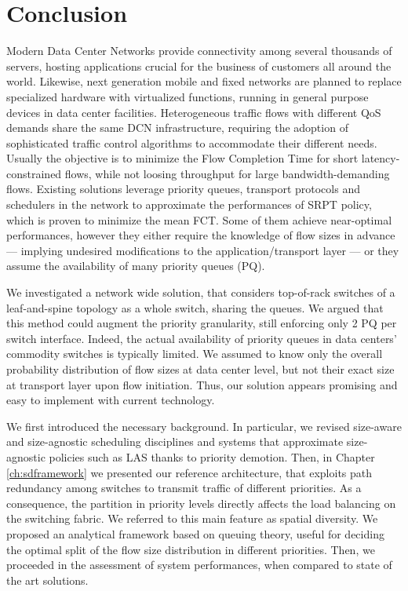 \chapter*{Conclusion}
Modern Data Center Networks provide connectivity among several thousands of servers, hosting applications crucial for the business of customers all around the world. Likewise, next generation mobile and fixed networks are planned to replace specialized hardware with virtualized functions, running in general purpose devices in data center facilities. Heterogeneous traffic flows with different QoS demands share the same DCN infrastructure, requiring the adoption of sophisticated traffic control algorithms to accommodate their different needs. Usually the objective is to minimize the Flow Completion Time for short latency-constrained flows, while not loosing throughput for large bandwidth-demanding flows. Existing solutions leverage priority queues, transport protocols and schedulers in the network to approximate the performances of SRPT policy, which is proven to minimize the mean FCT. Some of them achieve near-optimal performances, however they either require the knowledge of flow sizes in advance --- implying undesired modifications to the application/transport layer --- or they assume the availability of many priority queues (PQ).

We investigated a network wide solution, that considers top-of-rack switches of a leaf-and-spine topology as a whole switch, sharing the queues. We argued that this method could augment the priority granularity, still enforcing only 2 PQ per switch interface. Indeed, the actual availability of priority queues in data centers' commodity switches is typically limited. We assumed to know only the overall probability distribution of flow sizes at data center level, but not their exact size at transport layer upon flow initiation. Thus, our solution appears promising and easy to implement with current technology.

We first introduced the necessary background. In particular, we revised size-aware and size-agnostic scheduling disciplines and systems that approximate size-agnostic policies such as LAS thanks to priority demotion. Then, in Chapter \ref{ch:sdframework} we presented our reference architecture, that exploits path redundancy among switches to transmit traffic of different priorities. As a consequence, the partition in priority levels directly affects the load balancing on the switching fabric. We referred to this main feature as spatial diversity. We proposed an analytical framework based on queuing theory, useful for deciding the optimal split of the flow size distribution in different priorities. Then, we proceeded in the assessment of system performances, when compared to state of the art solutions.

